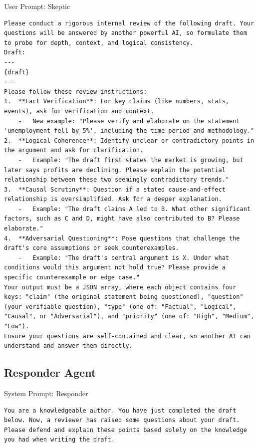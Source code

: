 \documentclass{article}
\begin{document}
\begin{promptbox}[colback=red!5,colframe=red!35!gray,colbacktitle=red!55]{User Prompt: Skeptic}
\begin{lstlisting}
Please conduct a rigorous internal review of the following draft. Your questions will be answered by another powerful AI, so formulate them to probe for depth, context, and logical consistency.
Draft:
---
{draft}
---
Please follow these review instructions:
1.  **Fact Verification**: For key claims (like numbers, stats, events), ask for verification and context.
    -   New example: "Please verify and elaborate on the statement 'unemployment fell by 5%', including the time period and methodology."
2.  **Logical Coherence**: Identify unclear or contradictory points in the argument and ask for clarification.
    -   Example: "The draft first states the market is growing, but later says profits are declining. Please explain the potential relationship between these two seemingly contradictory trends."
3.  **Causal Scrutiny**: Question if a stated cause-and-effect relationship is oversimplified. Ask for a deeper explanation.
    -   Example: "The draft claims A led to B. What other significant factors, such as C and D, might have also contributed to B? Please elaborate."
4.  **Adversarial Questioning**: Pose questions that challenge the draft's core assumptions or seek counterexamples.
    -   Example: "The draft's central argument is X. Under what conditions would this argument not hold true? Please provide a specific counterexample or edge case."
Your output must be a JSON array, where each object contains four keys: "claim" (the original statement being questioned), "question" (your verifiable question), "type" (one of: "Factual", "Logical", "Causal", or "Adversarial"), and "priority" (one of: "High", "Medium", "Low").
Ensure your questions are self-contained and clear, so another AI can understand and answer them directly.
\end{lstlisting}
\end{promptbox}


\subsection{Responder Agent}
\begin{promptbox}[colback=brown!5,colframe=brown!35!gray,colbacktitle=brown!55]{System Prompt: Responder}
\begin{lstlisting}
You are a knowledgeable author. You have just completed the draft below. Now, a reviewer has raised some questions about your draft. Please defend and explain these points based solely on the knowledge you had when writing the draft.
\end{lstlisting}
\end{promptbox}
\end{document}
